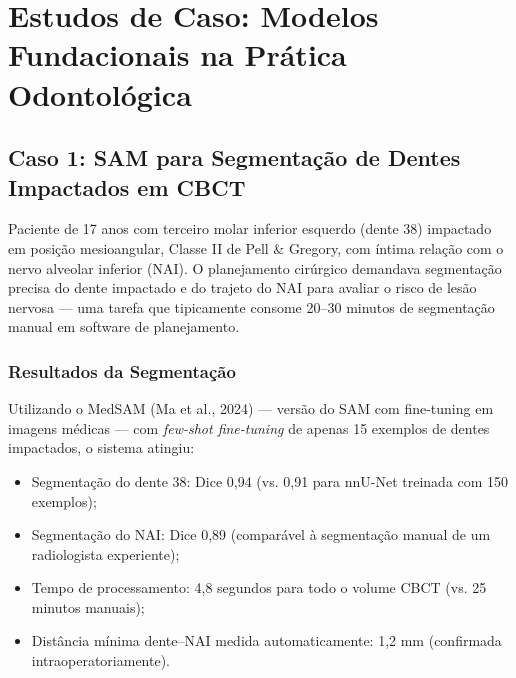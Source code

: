 \section{Estudos de Caso: Modelos Fundacionais na Prática Odontológica}

\subsection{Caso 1: SAM para Segmentação de Dentes Impactados em CBCT}

Paciente de 17 anos com terceiro molar inferior esquerdo (dente 38) impactado em posição mesioangular, Classe II de Pell \& Gregory, com íntima relação com o nervo alveolar inferior (NAI). O planejamento cirúrgico demandava segmentação precisa do dente impactado e do trajeto do NAI para avaliar o risco de lesão nervosa --- uma tarefa que tipicamente consome 20--30 minutos de segmentação manual em software de planejamento.

\subsubsection{Resultados da Segmentação}

Utilizando o MedSAM (Ma et al., 2024) --- versão do SAM com fine-tuning em imagens médicas --- com \textit{few-shot fine-tuning} de apenas 15 exemplos de dentes impactados, o sistema atingiu:
\begin{itemize}
    \item Segmentação do dente 38: Dice 0,94 (vs. 0,91 para nnU-Net treinada com 150 exemplos);
    \item Segmentação do NAI: Dice 0,89 (comparável à segmentação manual de um radiologista experiente);
    \item Tempo de processamento: 4,8 segundos para todo o volume CBCT (vs. 25 minutos manuais);
    \item Distância mínima dente--NAI medida automaticamente: 1,2 mm (confirmada intraoperatoriamente).
\end{itemize}


